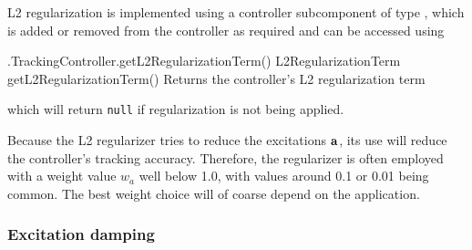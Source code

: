 L2 regularization is implemented using a controller subcomponent of type
, which
is added or removed from the controller as required and can be accessed using
%
\begin{methodtable}{0.58}{0.42}
\midline
%
\methodentry
{\inverse.TrackingController.getL2RegularizationTerm()}%
{L2RegularizationTerm getL2RegularizationTerm()}%
{Returns the controller's L2 regularization term
}%
%
\midline
\end{methodtable}
%
which will return {\tt null} if regularization is not being applied.

Because the L2 regularizer tries to reduce the excitations ${\bf a}$, its use will
reduce the controller's tracking accuracy. Therefore, the regularizer is often
employed with a weight value $w_a$ well below 1.0, with values around 0.1 or
0.01 being common. The best weight choice will of coarse depend on the
application.

\subsubsection{Excitation damping}
\label{ExcitationDamping:sec}

